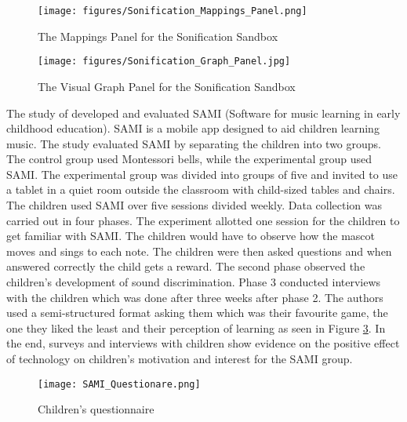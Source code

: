 \begin{figure}[H]
    \centering
    \texttt{[image: figures/Sonification\_Mappings\_Panel.png]}
    \caption{The Mappings Panel for the Sonification Sandbox \protect\cite{walker2003sonification}}
    \label{fig:Sonification_Mappings_Panel}
\end{figure}

\begin{figure}[H]
    \centering
    \texttt{[image: figures/Sonification\_Graph\_Panel.jpg]}
    \caption{The Visual Graph Panel for the Sonification Sandbox \protect\cite{walker2003sonification}}
    \label{fig:Sonification_Graph_Panel}
\end{figure}

\newpage

The study of  developed and evaluated SAMI (Software for music learning in early childhood education). SAMI is a mobile app designed to aid children learning music. The study evaluated SAMI by separating the children into two groups. The control group used Montessori bells, while the experimental group used SAMI. The experimental group was divided into groups of five  and invited to use a tablet in a quiet room outside the classroom with child-sized tables and chairs. The children used SAMI over five sessions divided weekly. Data collection was carried out in four phases. The experiment allotted one session for the children to get familiar with SAMI. The children would have to observe how the mascot moves and sings to each note. The children were then asked questions and when answered correctly the child gets a reward. The second phase observed the children's development of sound discrimination. Phase 3 conducted interviews with the children which was done after three weeks after phase 2. The authors used a semi-structured format asking them which was their favourite game, the one they liked the least and their perception of learning as seen in Figure \ref{fig:children_questionnaire}. In the end, surveys and interviews with children show evidence on the positive effect of technology on children’s motivation and interest for the SAMI group.
\begin{figure}[H]
    \centering
    \texttt{[image: SAMI\_Questionare.png]}
    \caption{Children's questionnaire \protect\cite{paule2017music}} 
    \label{fig:children_questionnaire}
\end{figure}


